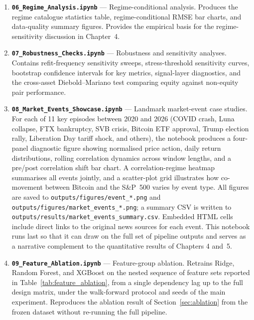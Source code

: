 \begin{enumerate}
    \item \textbf{\texttt{06\_Regime\_Analysis.ipynb}} --- Regime-conditional analysis. Produces the regime catalogue statistics table, regime-conditional RMSE bar charts, and data-quality summary figures. Provides the empirical basis for the regime-sensitivity discussion in Chapter~4.

    \item \textbf{\texttt{07\_Robustness\_Checks.ipynb}} --- Robustness and sensitivity analyses. Contains refit-frequency sensitivity sweeps, stress-threshold sensitivity curves, bootstrap confidence intervals for key metrics, signal-layer diagnostics, and the cross-asset Diebold--Mariano test comparing equity against non-equity pair performance.

    \item \textbf{\texttt{08\_Market\_Events\_Showcase.ipynb}} --- Landmark market-event case studies. For each of 11 key episodes between 2020 and 2026 (COVID crash, Luna collapse, FTX bankruptcy, SVB crisis, Bitcoin ETF approval, Trump election rally, Liberation Day tariff shock, and others), the notebook produces a four-panel diagnostic figure showing normalised price action, daily return distributions, rolling correlation dynamics across window lengths, and a pre/post correlation shift bar chart. A correlation-regime heatmap summarises all events jointly, and a scatter-plot grid illustrates how co-movement between Bitcoin and the S\&P~500 varies by event type. All figures are saved to \texttt{outputs/figures/event\_*.png} and \texttt{outputs/figures/market\_events\_*.png}; a summary CSV is written to \texttt{outputs/results/market\_events\_summary.csv}. Embedded HTML cells include direct links to the original news sources for each event. This notebook runs last so that it can draw on the full set of pipeline outputs and serves as a narrative complement to the quantitative results of Chapters 4 and~5.

    \item \textbf{\texttt{09\_Feature\_Ablation.ipynb}} --- Feature-group
          ablation. Retrains Ridge, Random Forest, and XGBoost on the nested
          sequence of feature sets reported in Table~\ref{tab:feature_ablation},
          from a single dependency lag up to the full design matrix, under the
          walk-forward protocol and seeds of the main experiment. Reproduces the
          ablation result of Section~\ref{sec:ablation} from the frozen dataset
          without re-running the full pipeline.
\end{enumerate}

